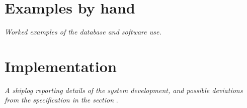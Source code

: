 \documentclass[a4paper,10pt]{article}
\begin{document}
\section{Examples by hand}
\label{sec:by_hand}

{\em Worked examples of the database and software use.}

\section{Implementation}
\label{sec:impl}

{\em A shiplog reporting details of the system development, and
possible deviations from the specification in the section
}.
\end{document}
